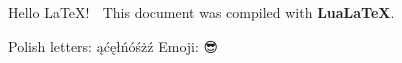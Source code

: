 \documentclass{article}
\begin{document}
Hello \LaTeX! 👋  
This document was compiled with \textbf{LuaLaTeX}.  

Polish letters: ąćęłńóśżź  
Emoji: 😎🚀✨  
\end{document}
